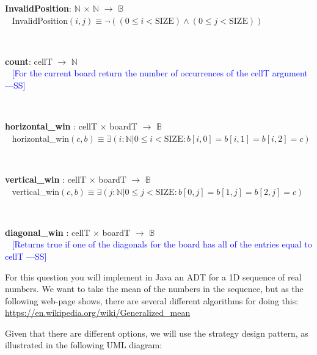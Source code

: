 \documentclass[12pt,fleqn]{examtst}
\newcommand{\authornote}[3]{\textcolor{#1}{[#3 ---#2]}}
\newcommand{\authornote}[3]{}
\newcommand{\wss}[1]{\authornote{blue}{SS}{#1}}
\begin{document}
\noindent \textbf{InvalidPosition}: $\mathbb{N}$ $\times$ $\mathbb{N}$ $\rightarrow$ $\mathbb{B}$\\
~\newline
InvalidPosition$(i, j) \equiv \neg ( ( 0 \leq i < \mbox{SIZE} ) \wedge ( 0 \leq j < \mbox{SIZE}))$

~\newline

\noindent \textbf{count}: cellT $\rightarrow$ $\mathbb{N}$\\
~\newline
\wss{For the current board return the number of occurrences of the cellT
  argument}
~\newline


~\newline

\noindent \textbf{horizontal\_win} : cellT $\times$ boardT $\rightarrow$ $\mathbb{B}$\\
~\newline
horizontal\_win$(c, b) \equiv \exists (i : \mathbb{N} | 0 \leq i < \mbox{SIZE} : b[i, 0] = b[i, 1] = b[i, 2] = c)$

~\newline

\noindent \textbf{vertical\_win} : cellT $\times$ boardT $\rightarrow$ $\mathbb{B}$\\
~\newline
vertical\_win$(c, b) \equiv \exists (j : \mathbb{N} | 0 \leq j < \mbox{SIZE} : b[0, j] = b[1, j] = b[2, j] = c)$

~\newline

\noindent \textbf{diagonal\_win} : cellT $\times$ boardT $\rightarrow$ $\mathbb{B}$\\
~\newline
\wss{Returns true if one of the diagonals for the board has all of the entries
  equal to cellT}
~\newline



\newpage

 For this question you will implement in Java an ADT for a 1D
sequence of real numbers.  We want to take the mean of the numbers in the
sequence, but as the following web-page shows, there are several different
algorithms for doing this: \url{https://en.wikipedia.org/wiki/Generalized_mean}

Given that there are different options, we will use the strategy design pattern,
as illustrated in the following UML diagram:
\end{document}
